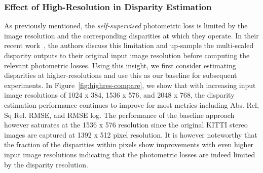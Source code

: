 \documentclass[letterpaper, 10 pt, conference]{ieeeconf}  \IEEEoverridecommandlockouts
\begin{document}
\subsubsection{Effect of High-Resolution in Disparity Estimation}
As previously mentioned, the \textit{self-supervised} photometric loss is limited by the image resolution and the corresponding disparities at which they operate. In their recent work~\cite{godard2018digging}, the authors discuss this limitation and up-sample the multi-scaled disparity outputs to their original input image resolution before computing the relevant photometric losses. Using this insight, we first consider estimating disparities at higher-resolutions and use this as our baseline for subsequent experiments. In Figure~\ref{fig:highres-compare}, we show that with increasing input image resolutions of 1024 x 384, 1536 x 576, and 2048 x 768, the disparity estimation performance continues to improve for most metrics including Abs. Rel, Sq Rel. RMSE, and RMSE log. The performance of the baseline approach however saturates at the 1536 x 576 resolution since the original KITTI stereo images are captured at 1392 x 512 pixel resolution. It is however noteworthy that the fraction of the disparities within  pixels show improvements with even higher input image resolutions indicating that the photometric losses are indeed limited by the disparity resolution. 
\end{document}
